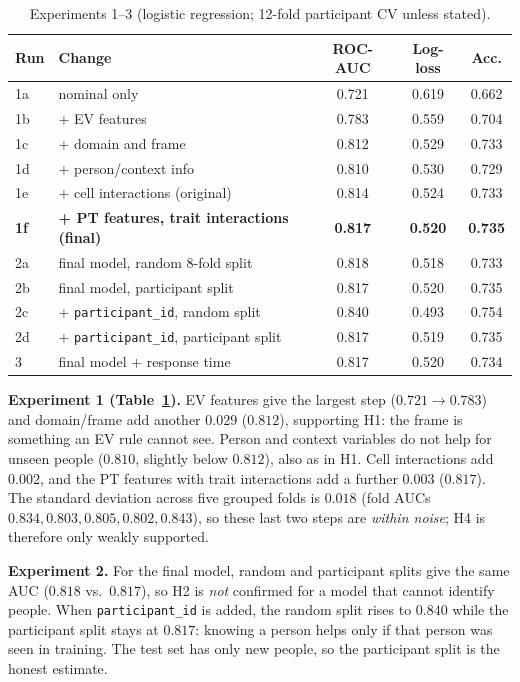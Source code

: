 \documentclass[11pt,a4paper]{article}
\begin{document}
\begin{table}[t]
\centering\small
\caption{Experiments 1--3 (logistic regression; 12-fold participant CV unless stated).}\label{tab:exp}
\begin{tabular}{llccc}
\toprule
Run & Change & ROC-AUC & Log-loss & Acc.\\
\midrule
1a & nominal only & 0.721 & 0.619 & 0.662\\
1b & + EV features & 0.783 & 0.559 & 0.704\\
1c & + domain and frame & 0.812 & 0.529 & 0.733\\
1d & + person/context info & 0.810 & 0.530 & 0.729\\
1e & + cell interactions (original) & 0.814 & 0.524 & 0.733\\
\textbf{1f} & \textbf{+ PT features, trait interactions (final)} & \textbf{0.817} & \textbf{0.520} & \textbf{0.735}\\
\midrule
2a & final model, random 8-fold split & 0.818 & 0.518 & 0.733\\
2b & final model, participant split & 0.817 & 0.520 & 0.735\\
2c & + \texttt{participant\_id}, random split & 0.840 & 0.493 & 0.754\\
2d & + \texttt{participant\_id}, participant split & 0.817 & 0.519 & 0.735\\
\midrule
3 & final model + response time & 0.817 & 0.520 & 0.734\\
\bottomrule
\end{tabular}
\end{table}

\textbf{Experiment 1 (Table~\ref{tab:exp}).} EV features give the largest step ($0.721\to0.783$) and domain/frame add another $0.029$ ($0.812$), supporting H1: the frame is something an EV rule cannot see. Person and context variables do not help for unseen people ($0.810$, slightly below $0.812$), also as in H1. Cell interactions add $0.002$, and the PT features with trait interactions add a further $0.003$ ($0.817$). The standard deviation across five grouped folds is $0.018$ (fold AUCs $0.834, 0.803, 0.805, 0.802, 0.843$), so these last two steps are \emph{within noise}; H4 is therefore only weakly supported.

\textbf{Experiment 2.} For the final model, random and participant splits give the same AUC ($0.818$ vs.\ $0.817$), so H2 is \emph{not} confirmed for a model that cannot identify people. When \texttt{participant\_id} is added, the random split rises to $0.840$ while the participant split stays at $0.817$: knowing a person helps only if that person was seen in training. The test set has only new people, so the participant split is the honest estimate.
\end{document}
